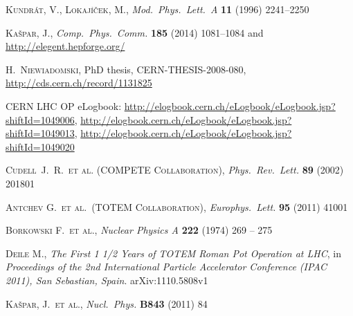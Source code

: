 \documentclass[3p,onecolumn,12pt,times,longtitle]{elsarticle}
\def\etal{et al.}
\def\Name#1{\textsc{#1}, }
\def\REVIEW#1#2#3#4{{\it #1} {\bf #2} (#3) #4}
\begin{document}
\begin{thebibliography}{99}
	\Name{Kundr\' at, V., Lokaj\' i\v cek, M.}
	\REVIEW{Mod.~Phys.~Lett.~A}{11}{1996}{2241--2250}

	\Name{Ka\v spar, J.}
	\REVIEW{Comp.~Phys.~Comm.}{185}{2014}{1081--1084}
	and \url{http://elegent.hepforge.org/}

	\Name{H.~Niewiadomski}
    PhD thesis, 
    CERN-THESIS-2008-080,
	\url{http://cds.cern.ch/record/1131825}

 CERN LHC OP eLogbook:
	\url{http://elogbook.cern.ch/eLogbook/eLogbook.jsp?shiftId=1049006},
	\url{http://elogbook.cern.ch/eLogbook/eLogbook.jsp?shiftId=1049013}, 
	\url{http://elogbook.cern.ch/eLogbook/eLogbook.jsp?shiftId=1049020}

	\Name{Cudell~J.~R.~\etal{} (COMPETE Collaboration)}
	\REVIEW{Phys.\ Rev.\ Lett.}{89}{2002}{201801}

	\Name{Antchev G.~\etal{}~(TOTEM Collaboration)}
	\REVIEW{Europhys.~Lett.}{95}{2011}{41001}

	\Name{Borkowski F.~et al.}
	\REVIEW{Nuclear Physics A}{222}{1974}{269 -- 275}
	

\end{thebibliography}



\iffalse

	\Name{Deile M.}
	{\it The First 1 1/2 Years of TOTEM Roman Pot Operation at LHC}, in
	{\it Proceedings of the 2nd International Particle Accelerator Conference (IPAC 2011), San Sebastian, Spain}. 
	arXiv:1110.5808v1

	\Name{Ka\v spar, J.~\etal}
	\REVIEW{Nucl.~Phys.}{B843}{2011}{84}
\end{document}
